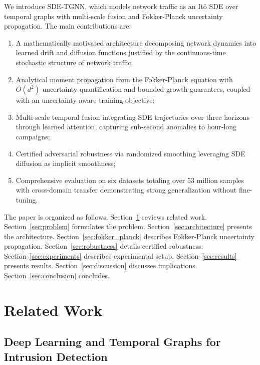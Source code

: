 \documentclass[journal]{IEEEtran}
\begin{document}
We introduce SDE-TGNN, which models network traffic as an It\^{o} SDE over temporal graphs with multi-scale fusion and Fokker-Planck uncertainty propagation. The main contributions are:
\begin{enumerate}
\item A mathematically motivated architecture decomposing network dynamics into learned drift and diffusion functions justified by the continuous-time stochastic structure of network traffic;
\item Analytical moment propagation from the Fokker-Planck equation with $O(d^2)$ uncertainty quantification and bounded growth guarantees, coupled with an uncertainty-aware training objective;
\item Multi-scale temporal fusion integrating SDE trajectories over three horizons through learned attention, capturing sub-second anomalies to hour-long campaigns;
\item Certified adversarial robustness via randomized smoothing leveraging SDE diffusion as implicit smoothness;
\item Comprehensive evaluation on six datasets totaling over 53 million samples with cross-domain transfer demonstrating strong generalization without fine-tuning.
\end{enumerate}

The paper is organized as follows. Section~\ref{sec:related} reviews related work. Section~\ref{sec:problem} formulates the problem. Section~\ref{sec:architecture} presents the architecture. Section~\ref{sec:fokker_planck} describes Fokker-Planck uncertainty propagation. Section~\ref{sec:robustness} details certified robustness. Section~\ref{sec:experiments} describes experimental setup. Section~\ref{sec:results} presents results. Section~\ref{sec:discussion} discusses implications. Section~\ref{sec:conclusion} concludes.


\section{Related Work}
\label{sec:related}

\subsection{Deep Learning and Temporal Graphs for Intrusion Detection}
\end{document}
